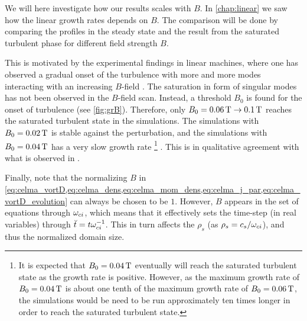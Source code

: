 %
We will here investigate how our results scales with $B$.
In \cref{chap:linear} we saw how the linear growth rates depends on $B$.
The comparison will be done by comparing the profiles in the steady state and the result from the saturated turbulent phase for different field strength $B$.

This is motivated by the experimental findings in linear machines, where one has observed a gradual onset of the turbulence with more and more modes interacting with an increasing $B$-field \cite{Klinger1997,Klinger1997a,Burin2005}.
The saturation in form of singular modes has not been observed in the $B$-field scan.
Instead, a threshold $B_0$ is found for the onset of turbulence (see \cref{fig:grB}).
Therefore, only $B_0 = 0.06\, \text{T} \to 0.1\, \text{T}$ reaches the saturated turbulent state in the simulations.
The simulations with $B_0 = 0.02\, \text{T}$ is stable against the perturbation, and the simulations with $B_0 = 0.04\, \text{T}$ has a very slow growth rate%
\footnote{It is expected that $B_0=0.04\, \text{T}$ eventually will reach the saturated turbulent state as the growth rate is positive.
    However, as the maximum growth rate of $B_0=0.04\, \text{T}$ is about one tenth of the maximum growth rate of $B_0=0.06\, \text{T}$, the simulations would be need to be run approximately ten times longer in order to reach the saturated turbulent state.
}
%
.
This is in qualitative agreement with what is observed in \cite{Burin2005}.

Finally, note that the normalizing $B$ in \cref{eq:celma_vortD,eq:celma_dens,eq:celma_mom_dens,eq:celma_j_par,eq:celma_vortD_evolution} can always be chosen to be $1$.
However, $B$ appears in the set of equations through $\omega_{ci}$, which means that it effectively sets the time-step (in real variables) through $\breve{t}=t\omega_{ci}^{-1}$.
This in turn affects the $\rho_s$ (as $\rho_s=c_s/\omega_{ci}$), and thus the normalized domain size.

